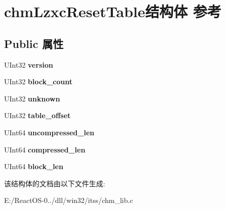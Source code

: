 \hypertarget{structchm_lzxc_reset_table}{}\section{chm\+Lzxc\+Reset\+Table结构体 参考}
\label{structchm_lzxc_reset_table}
\subsection*{Public 属性}
\begin{DoxyCompactItemize}
\item 
\mbox{\label{structchm_lzxc_reset_table_a1c875f10aadafc6fe33b7adcfc9ae5dd}} 
U\+Int32 {\bfseries version}
\item 
\mbox{\label{structchm_lzxc_reset_table_a8a13dee213638eb9e40e6479406ffabc}} 
U\+Int32 {\bfseries block\+\_\+count}
\item 
\mbox{\label{structchm_lzxc_reset_table_a1e2861a2af47e1ac934e8edfeb03ade7}} 
U\+Int32 {\bfseries unknown}
\item 
\mbox{\label{structchm_lzxc_reset_table_a25be8c756c66918e5183a99f7f3cfdf4}} 
U\+Int32 {\bfseries table\+\_\+offset}
\item 
\mbox{\label{structchm_lzxc_reset_table_ab44ca68074a6e977667014a991b7d134}} 
U\+Int64 {\bfseries uncompressed\+\_\+len}
\item 
\mbox{\label{structchm_lzxc_reset_table_a0ca7ab567aaf4ec02486683a02e9afe2}} 
U\+Int64 {\bfseries compressed\+\_\+len}
\item 
\mbox{\label{structchm_lzxc_reset_table_aaf69767b6ddc9f88baf9354cf16b3c74}} 
U\+Int64 {\bfseries block\+\_\+len}
\end{DoxyCompactItemize}


该结构体的文档由以下文件生成\+:\begin{DoxyCompactItemize}
\item 
E\+:/\+React\+O\+S-\/0../dll/win32/itss/chm\+\_\+lib.\+c\end{DoxyCompactItemize}
